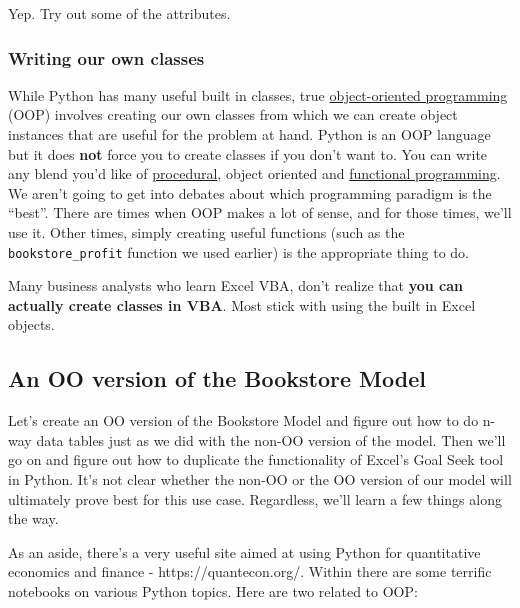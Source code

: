 \documentclass[11pt]{article}
\begin{document}
    Yep. Try out some of the attributes.

    \hypertarget{writing-our-own-classes}{%
\subsubsection{Writing our own classes}\label{writing-our-own-classes}}

While Python has many useful built in classes, true
\href{https://en.wikipedia.org/wiki/Object-oriented_programming}{object-oriented
programming} (OOP) involves creating our own classes from which we can
create object instances that are useful for the problem at hand. Python
is an OOP language but it does \textbf{not} force you to create classes
if you don't want to. You can write any blend you'd like of
\href{https://en.wikipedia.org/wiki/Procedural_programming}{procedural},
object oriented and
\href{https://en.wikipedia.org/wiki/Functional_programming}{functional
programming}. We aren't going to get into debates about which
programming paradigm is the ``best''. There are times when OOP makes a
lot of sense, and for those times, we'll use it. Other times, simply
creating useful functions (such as the \texttt{bookstore\_profit}
function we used earlier) is the appropriate thing to do.

Many business analysts who learn Excel VBA, don't realize that
\textbf{you can actually create classes in VBA}. Most stick with using
the built in Excel objects.

    \hypertarget{an-oo-version-of-the-bookstore-model}{%
\subsection{An OO version of the Bookstore
Model}\label{an-oo-version-of-the-bookstore-model}}

Let's create an OO version of the Bookstore Model and figure out how to
do n-way data tables just as we did with the non-OO version of the
model. Then we'll go on and figure out how to duplicate the
functionality of Excel's Goal Seek tool in Python. It's not clear
whether the non-OO or the OO version of our model will ultimately prove
best for this use case. Regardless, we'll learn a few things along the
way.

As an aside, there's a very useful site aimed at using Python for
quantitative economics and finance - https://quantecon.org/. Within
there are some terrific notebooks on various Python topics. Here are two
related to OOP:
\end{document}
